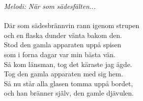 {\footnotesize\textit{Melodi: När som sädesfälten...}}\\
\\
Där som sädesbrännvin rann igenom strupen\\
och en flaska dunder vänta bakom den.\\
Stod den gamla apparaten uppå spisen\\
som i forna dagar var min bästa vän.\\
Så kom länsman, tog det käraste jag ägde.\\
Tog den gamla apparaten med sig hem.\\
Så nu står alla glasen tomma uppå bordet,\\
och han bränner själv, den gamle djävulen.
